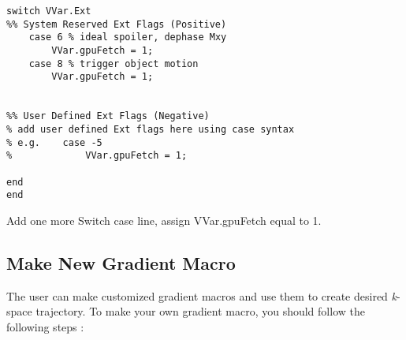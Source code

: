 \documentclass{book}%
\begin{document}
\begin{enumerate}
\begin{verbatim}
switch VVar.Ext
%% System Reserved Ext Flags (Positive)   
    case 6 % ideal spoiler, dephase Mxy
        VVar.gpuFetch = 1;
    case 8 % trigger object motion
        VVar.gpuFetch = 1;
				
				
%% User Defined Ext Flags (Negative)
% add user defined Ext flags here using case syntax
% e.g.    case -5
%             VVar.gpuFetch = 1;

end
end
\end{verbatim}

Add one more Switch case line, assign VVar.gpuFetch equal to 1. 

\end{enumerate}

\subsection{Make New Gradient Macro}

The user can make customized gradient macros and use them to create desired \textit{k}-space trajectory. To make your own gradient macro, you should follow the following steps :
\end{document}
